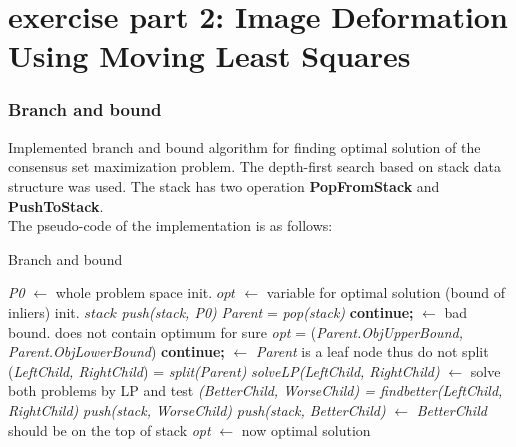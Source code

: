 \documentclass[paper=a4, fontsize=11pt]{scrartcl} %
\numberwithin{equation}{section} %
\numberwithin{figure}{section} %
\numberwithin{table}{section} %
\newcommand{\funcname}[1]{\textbf{#1}}
\begin{document}

\section{exercise part 2: Image Deformation Using Moving Least Squares}


\subsubsection{Branch and bound}

Implemented branch and bound algorithm for finding optimal solution of the consensus set maximization problem. The depth-first search based on stack data structure was used. The stack has two operation \funcname{PopFromStack} and \funcname{PushToStack}. \\

The pseudo-code of the implementation is as follows: 

\begin{algorithm}
\caption{Branch and bound}\label{euclid}
\begin{algorithmic}[1]
\State \textit{P0} $\gets$ whole problem space
\State init. $\textit{opt}$ $\gets$ variable for optimal solution (bound of inliers)
\State init. $\textit{stack}$ 
\State \textit{push(stack, P0)}
\State 
{}
	\State \textit{Parent} = \textit{pop(stack)}
		\State \textbf{continue;} $\gets$ bad bound. does not contain optimum for sure
	\EndIf
	\State
        		\State \textit{opt} = (\textit{Parent.ObjUpperBound, Parent.ObjLowerBound})
        \EndIf
        	\State
        		\State \textbf{continue;} $\gets$ \textit{Parent} is a leaf node thus do not split
        \EndIf
        \State
        \State (\textit{LeftChild, RightChild}) = \textit{split(Parent)}
        \State \textit{solveLP(LeftChild, RightChild)} $\gets$ solve both problems by LP and test
	\State
	\State \textit{(BetterChild, WorseChild) = findbetter(LeftChild, RightChild)}
	\State \textit{push(stack, WorseChild)}	
	\State \textit{push(stack, BetterChild)} $\gets$ \textit{BetterChild} should be on the top of stack
\EndWhile
\State
\State \textit{opt} $\gets$ now optimal solution  
\end{algorithmic}
\end{algorithm}
\end{document}
